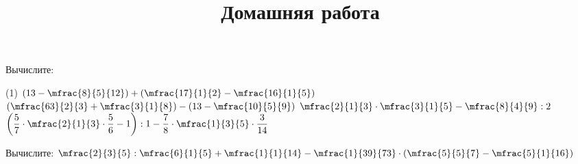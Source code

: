 \begin{consultation}
	\begin{listofex}
		\item Вычислите: 
		\begin{tasks}(1)
			\task \( \left( 13-\mfrac{8}{5}{12} \right)+\left( \mfrac{17}{1}{2}-\mfrac{16}{1}{5} \right) \)
			\task \( \left( \mfrac{63}{2}{3}+\mfrac{3}{1}{8} \right)-\left( 13-\mfrac{10}{5}{9} \right) \)
			\task \( \mfrac{2}{1}{3}\cdot\mfrac{3}{1}{5}-\mfrac{8}{4}{9}:2 \)
			\task \( \left( \dfrac{5}{7}\cdot\mfrac{2}{1}{3}\cdot\dfrac{5}{6}-1 \right):1-\dfrac{7}{8}\cdot\mfrac{1}{3}{5}\cdot\dfrac{3}{14} \)
		\end{tasks}
	\end{listofex}
	\newpage
	\title{Домашняя работа}
	\begin{listofex}
		\item Вычислите: \quad \( \mfrac{2}{3}{5}:\mfrac{6}{1}{5}+\mfrac{1}{1}{14}-\mfrac{1}{39}{73}\cdot\left( \mfrac{5}{5}{7}-\mfrac{5}{1}{16} \right) \)
	\end{listofex}
\end{consultation}


